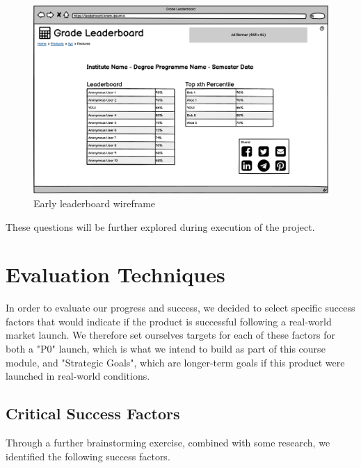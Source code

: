 \begin{figure}
    \centering
    \includegraphics[width=\textwidth]{images/One course - Leaderboard v07.png}
    \caption{Early leaderboard wireframe}
    \label{fig:earlyleaderboardwireframe}
\end{figure}

These questions will be further explored during execution of the project.

\section{Evaluation Techniques}
In order to evaluate our progress and success, we decided to select specific success factors that would indicate if the product is successful following a real-world market launch. We therefore set ourselves targets for each of these factors for both a "P0" launch, which is what we intend to build as part of this course module, and "Strategic Goals", which are longer-term goals if this product were launched in real-world conditions.

\subsection{Critical Success Factors}
Through a further brainstorming exercise, combined with some research, we identified the following success factors.

